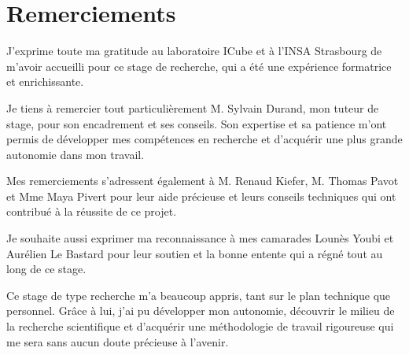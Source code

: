 \chapter*{Remerciements}

J'exprime toute ma gratitude au laboratoire ICube et à l'INSA Strasbourg de m'avoir accueilli pour ce stage de recherche, qui a été une expérience formatrice et enrichissante.

Je tiens à remercier tout particulièrement M. Sylvain Durand, mon tuteur de stage, pour son encadrement et ses conseils. Son expertise et sa patience m'ont permis de développer mes compétences en recherche et d'acquérir une plus grande autonomie dans mon travail.

Mes remerciements s'adressent également à M. Renaud Kiefer, M. Thomas Pavot et Mme Maya Pivert pour leur aide précieuse et leurs conseils techniques qui ont contribué à la réussite de ce projet.

Je souhaite aussi exprimer ma reconnaissance à mes camarades Lounès Youbi et Aurélien Le Bastard pour leur soutien et la bonne entente qui a régné tout au long de ce stage.

Ce stage de type recherche m'a beaucoup appris, tant sur le plan technique que personnel. Grâce à lui, j'ai pu développer mon autonomie, découvrir le milieu de la recherche scientifique et d'acquérir une méthodologie de travail rigoureuse qui me sera sans aucun doute précieuse à l'avenir.

